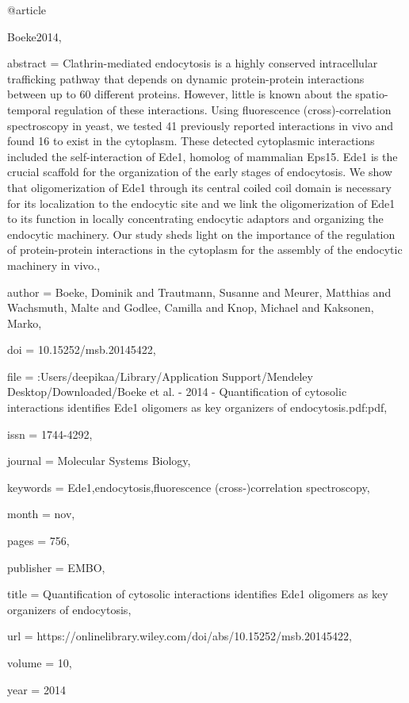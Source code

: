 @article{Boeke2014,

abstract = {Clathrin-mediated endocytosis is a highly conserved intracellular trafficking pathway that depends on dynamic protein-protein interactions between up to 60 different proteins. However, little is known about the spatio-temporal regulation of these interactions. Using fluorescence (cross)-correlation spectroscopy in yeast, we tested 41 previously reported interactions in vivo and found 16 to exist in the cytoplasm. These detected cytoplasmic interactions included the self-interaction of Ede1, homolog of mammalian Eps15. Ede1 is the crucial scaffold for the organization of the early stages of endocytosis. We show that oligomerization of Ede1 through its central coiled coil domain is necessary for its localization to the endocytic site and we link the oligomerization of Ede1 to its function in locally concentrating endocytic adaptors and organizing the endocytic machinery. Our study sheds light on the importance of the regulation of protein-protein interactions in the cytoplasm for the assembly of the endocytic machinery in vivo.},

author = {Boeke, Dominik and Trautmann, Susanne and Meurer, Matthias and Wachsmuth, Malte and Godlee, Camilla and Knop, Michael and Kaksonen, Marko},

doi = {10.15252/msb.20145422},

file = {:Users/deepikaa/Library/Application Support/Mendeley Desktop/Downloaded/Boeke et al. - 2014 - Quantification of cytosolic interactions identifies Ede1 oligomers as key organizers of endocytosis.pdf:pdf},

issn = {1744-4292},

journal = {Molecular Systems Biology},

keywords = {Ede1,endocytosis,fluorescence (cross‐)correlation spectroscopy},

month = {nov},

pages = {756},

publisher = {EMBO},

title = {{Quantification of cytosolic interactions identifies Ede1 oligomers as key organizers of endocytosis}},

url = {https://onlinelibrary.wiley.com/doi/abs/10.15252/msb.20145422},

volume = {10},

year = {2014}

}

